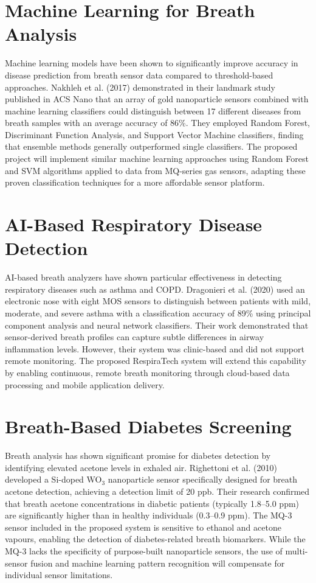 \section{Machine Learning for Breath Analysis}
Machine learning models have been shown to significantly improve accuracy in disease prediction from breath sensor data compared to threshold-based approaches. Nakhleh et al. (2017) demonstrated in their landmark study published in ACS Nano that an array of gold nanoparticle sensors combined with machine learning classifiers could distinguish between 17 different diseases from breath samples with an average accuracy of 86\%. They employed Random Forest, Discriminant Function Analysis, and Support Vector Machine classifiers, finding that ensemble methods generally outperformed single classifiers. The proposed project will implement similar machine learning approaches using Random Forest and SVM algorithms applied to data from MQ-series gas sensors, adapting these proven classification techniques for a more affordable sensor platform.

\section{AI-Based Respiratory Disease Detection}
AI-based breath analyzers have shown particular effectiveness in detecting respiratory diseases such as asthma and COPD. Dragonieri et al. (2020) used an electronic nose with eight MOS sensors to distinguish between patients with mild, moderate, and severe asthma with a classification accuracy of 89\% using principal component analysis and neural network classifiers. Their work demonstrated that sensor-derived breath profiles can capture subtle differences in airway inflammation levels. However, their system was clinic-based and did not support remote monitoring. The proposed RespiraTech system will extend this capability by enabling continuous, remote breath monitoring through cloud-based data processing and mobile application delivery.

\section{Breath-Based Diabetes Screening}
Breath analysis has shown significant promise for diabetes detection by identifying elevated acetone levels in exhaled air. Righettoni et al. (2010) developed a Si-doped WO$_3$ nanoparticle sensor specifically designed for breath acetone detection, achieving a detection limit of 20 ppb. Their research confirmed that breath acetone concentrations in diabetic patients (typically 1.8--5.0 ppm) are significantly higher than in healthy individuals (0.3--0.9 ppm). The MQ-3 sensor included in the proposed system is sensitive to ethanol and acetone vapours, enabling the detection of diabetes-related breath biomarkers. While the MQ-3 lacks the specificity of purpose-built nanoparticle sensors, the use of multi-sensor fusion and machine learning pattern recognition will compensate for individual sensor limitations.

